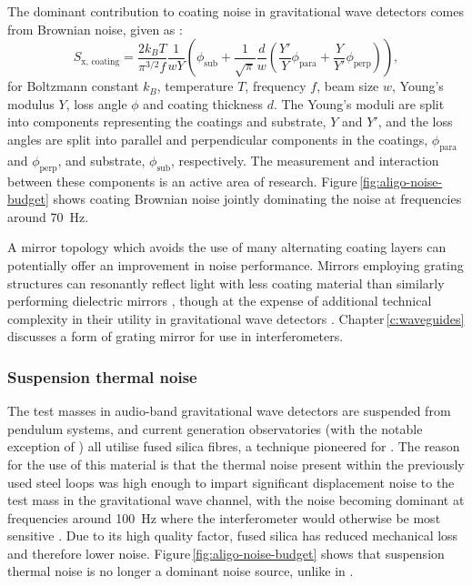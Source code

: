 The dominant contribution to coating noise in gravitational wave detectors comes from Brownian noise, given as \cite{Harry2002}:
\begin{equation}
  \label{eq:coating-brownian-psd}
  S_{\text{x, coating}} = \frac{2 k_B T}{\pi^{3/2} f} \frac{1}{w Y} \left( \phi_{\text{sub}} + \frac{1}{\sqrt{\pi}} \frac{d}{w} \left( \frac{Y'}{Y} \phi_{\text{para}} + \frac{Y}{Y'} \phi_{\text{perp}} \right) \right),
\end{equation}
for Boltzmann constant $k_B$, temperature $T$, frequency $f$, beam size $w$, Young's modulus $Y$, loss angle $\phi$ and coating thickness $d$. The Young's moduli are split into components representing the coatings and substrate, $Y$ and $Y'$, and the loss angles are split into parallel and perpendicular components in the coatings, $\phi_{\text{para}}$ and $\phi_{\text{perp}}$, and substrate, $\phi_{\text{sub}}$, respectively. The measurement and interaction between these components is an active area of research. Figure\,\ref{fig:aligo-noise-budget} shows coating Brownian noise jointly dominating the noise at frequencies around \SI{70}{\hertz}.

A mirror topology which avoids the use of many alternating coating layers can potentially offer an improvement in noise performance. Mirrors employing grating structures can resonantly reflect light with less coating material than similarly performing dielectric mirrors \cite{Mashev1985}, though at the expense of additional technical complexity in their utility in gravitational wave detectors \cite{Leavey2015}. Chapter\,\ref{c:waveguides} discusses a form of grating mirror for use in interferometers.

\subsubsection{\label{sec:sus-thermal-noise}Suspension thermal noise}
The test masses in audio-band gravitational wave detectors are suspended from pendulum systems, and current generation observatories (with the notable exception of \KAGRA{}) all utilise fused silica fibres, a technique pioneered for \GEO{} \cite{Barr2002}. The reason for the use of this material is that the thermal noise present within the previously used steel loops was high enough to impart significant displacement noise to the test mass in the gravitational wave channel, with the noise becoming dominant at frequencies around \SI{100}{\hertz} where the interferometer would otherwise be most sensitive \cite{Hammond2012}. Due to its high quality factor, fused silica has reduced mechanical loss and therefore lower noise. Figure\,\ref{fig:aligo-noise-budget} shows that suspension thermal noise is no longer a dominant noise source, unlike in \ILIGO{}.

